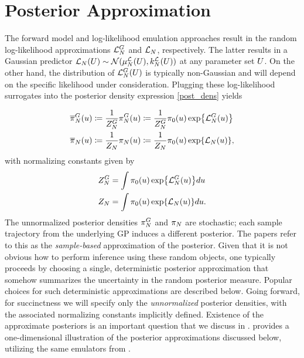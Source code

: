 \documentclass[12pt]{article}
\begin{document}
\section{Posterior Approximation}
The forward model and log-likelihood emulation approaches result in the random log-likelihood approximations 
$\llikEmFwd[\Ndesign]$ and $\llikEm[\Ndesign]$, respectively. The latter results in a Gaussian predictor 
$\llikEm[\Ndesign](\parMat) \sim \Gaussian(\emMean[\Ndesign]{\llik}(\parMat), \emKer[\Ndesign]{\llik}(\parMat))$ 
at any parameter set $\parMat$. On the other hand, the distribution of $\llikEmFwd[\Ndesign](\parMat)$ is 
typically non-Gaussian and will depend on the specific likelihood under consideration.
Plugging these log-likelihood surrogates into the posterior density expression \ref{post_dens} yields

\begin{align}
\fwdEmRdm[\Ndesign]{\postDensNorm}(\Par) 
&\Def \frac{1}{\fwdEmRdm[\Ndesign]{\normCst}} \fwdEmRdmDens[\Ndesign](\Par) 
\Def  \frac{1}{\fwdEmRdm[\Ndesign]{\normCst}} \priorDens(\Par) \Exp{\llikEmFwd[\Ndesign](\Par)} \label{post_dens_random_fwd} \\
\llikEmRdm[\Ndesign]{\postDensNorm}(\Par) 
&\Def \frac{1}{\llikEmRdm[\Ndesign]{\normCst}} \llikEmRdmDens[\Ndesign](\Par) 
\Def \frac{1}{\llikEmRdm[\Ndesign]{\normCst}} \priorDens(\Par) \Exp{\llikEm[\Ndesign](\Par)} \label{post_dens_random_llik},
\end{align}
with normalizing constants given by 
\begin{align}
\fwdEmRdm[\Ndesign]{\normCst}
&= \int \priorDens(\Par) \Exp{\llikEmFwd[\Ndesign](\Par)} d\Par \label{norm_cst_random_fwd} \\
\llikEmRdm[\Ndesign]{\normCst}
&= \int \priorDens(\Par) \Exp{\llikEm[\Ndesign](\Par)} d\Par \label{norm_cst_random_llik}. 
\end{align}
The unnormalized posterior densities $\fwdEmRdmDens[\Ndesign]$ and $\llikEmRdmDens[\Ndesign]$ are stochastic; 
each sample trajectory from the underlying GP induces a different posterior. 
The papers \cite{StuartTeck1, StuartTeck2} refer to this as the \textit{sample-based}
approximation of the posterior. Given that it is not obvious how to perform inference using these random objects, one typically 
proceeds by choosing a single, deterministic posterior approximation that somehow summarizes the uncertainty in the 
random posterior measure. Popular choices for such deterministic approximations are described below. Going forward, 
for succinctness we will specify only the \textit{unnormalized} posterior densities, with the associated normalizing constants  
implicitly defined. Existence of the approximate posteriors is an important question that we discuss in . 
 provides a one-dimensional illustration of the posterior approximations 
discussed below, utilizing the same emulators from . 
\end{document}
